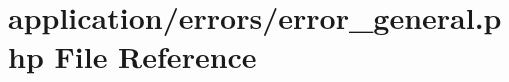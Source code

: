 \hypertarget{error__general_8php}{\section{application/errors/error\-\_\-general.php File Reference}
\label{error__general_8php}
}
